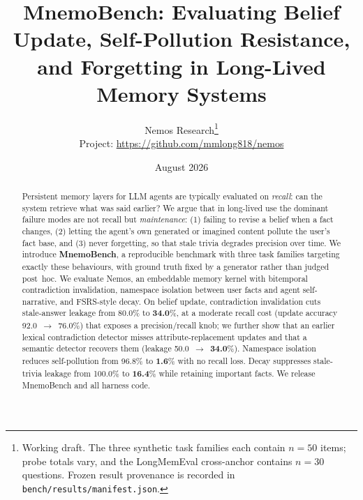\documentclass[11pt]{article}
\title{MnemoBench: Evaluating Belief Update, Self-Pollution Resistance,\\
and Forgetting in Long-Lived Memory Systems}
\author{Nemos Research\thanks{Working draft. The three synthetic task families each contain
$n{=}50$ items; probe totals vary, and the LongMemEval cross-anchor contains $n{=}30$
questions. Frozen result provenance is recorded in
\texttt{bench/results/manifest.json}.}\\
Project: \url{https://github.com/mmlong818/nemos}}
\date{August 2026}
\newcommand{\bucSLRfull}{\textbf{34.0}}   %
\newcommand{\bucSLRvone}{50.0}            %
\newcommand{\bucSLRnone}{80.0}            %
\newcommand{\bucUAfull}{76.0}
\newcommand{\bucUAnone}{92.0}
\newcommand{\aspPRiso}{\textbf{1.6}}      %
\newcommand{\aspPRshared}{96.8}           %
\newcommand{\forTLdecay}{\textbf{16.4}}
\newcommand{\forTLnone}{100.0}
\begin{document}
\maketitle

\begin{abstract}
Persistent memory layers for LLM agents are typically evaluated on \emph{recall}:
can the system retrieve what was said earlier? We argue that in long-lived use the
dominant failure modes are not recall but \emph{maintenance}: (1) failing to revise a
belief when a fact changes, (2) letting the agent's own generated or imagined content
pollute the user's fact base, and (3) never forgetting, so that stale trivia degrades
precision over time.
We introduce \textbf{MnemoBench}, a reproducible benchmark with
three task families targeting exactly these behaviours, with ground truth fixed by a
generator rather than judged post~hoc. We evaluate Nemos, an embeddable memory kernel
with bitemporal contradiction invalidation, namespace isolation between user facts and
agent self-narrative, and FSRS-style decay. On belief update, contradiction invalidation
cuts stale-answer leakage from \bucSLRnone{}\% to \bucSLRfull{}\%, at a moderate recall
cost (update accuracy \bucUAnone{}~$\rightarrow$~\bucUAfull{}\%) that exposes a
precision/recall knob; we further show that an earlier lexical contradiction detector
misses attribute-replacement updates and that a semantic detector recovers them
(leakage \bucSLRvone{}~$\rightarrow$~\bucSLRfull{}\%). Namespace isolation reduces
self-pollution from \aspPRshared{}\% to \aspPRiso{}\% with no recall loss. Decay suppresses
stale-trivia leakage from \forTLnone{}\% to \forTLdecay{}\% while retaining important facts.
We release MnemoBench and all harness code.
\end{abstract}
\end{document}
